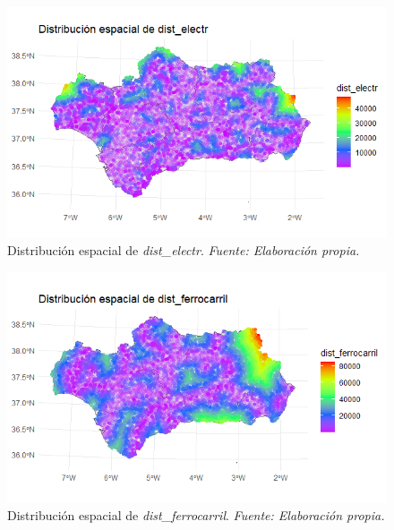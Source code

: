 \documentclass[12pt,a4paper,]{book}
\numberwithin{dummy}{section}
\theoremstyle{ocrenumbox}
\theoremstyle{blacknumex}
\theoremstyle{blacknumbox}
\theoremstyle{ocrenum}
\theoremstyle{ocrenum}
\begin{document}
\begin{figure}[H]
\centering
\includegraphics[width = \textwidth]{graficos/dist_electr_spat.png}
\caption[Distribución espacial de \textit{dist\_electr}]{Distribución espacial de \textit{dist\_electr}. \it Fuente: Elaboración propia.}
\label{fig:dist_electr_spat}
\end{figure}

\begin{figure}[H]
\centering
\includegraphics[width = \textwidth]{graficos/dist_ferrocarril_spat.png}
\caption[Distribución espacial de \textit{dist\_ferrocarril}]{Distribución espacial de \textit{dist\_ferrocarril}. \it Fuente: Elaboración propia.}
\label{fig:dist_ferrocarril_spat}
\end{figure}
\end{document}
